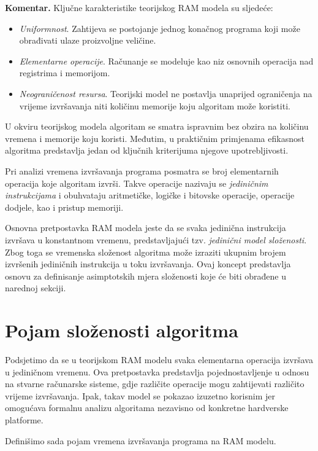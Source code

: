 \textbf{Komentar.} Ključne karakteristike teorijskog RAM modela su sljedeće:

\begin{itemize}
	\item \textit{Uniformnost}. Zahtijeva se postojanje jednog konačnog programa koji može obrađivati ulaze proizvoljne veličine.
	
	\item \textit{Elementarne operacije}. Računanje se modeluje kao niz osnovnih operacija nad registrima i memorijom.
	
	\item \textit{Neograničenost resursa}. Teorijski model ne postavlja unaprijed ograničenja na vrijeme izvršavanja niti količinu memorije koju algoritam može koristiti.
\end{itemize}

U okviru teorijskog modela algoritam se smatra ispravnim bez obzira na količinu vremena i memorije koju koristi. Međutim, u praktičnim primjenama efikasnost algoritma predstavlja jedan od ključnih kriterijuma njegove upotrebljivosti.

Pri analizi vremena izvršavanja programa posmatra se broj elementarnih operacija koje algoritam izvrši. Takve operacije nazivaju se \textit{jediničnim instrukcijama} i obuhvataju aritmetičke, logičke i bitovske operacije, operacije dodjele, kao i pristup memoriji.

Osnovna pretpostavka RAM modela jeste da se svaka jedinična instrukcija izvršava u konstantnom vremenu, predstavljajući tzv. \textit{jedinični model složenosti}.  Zbog toga se vremenska složenost algoritma može izraziti ukupnim brojem izvršenih jediničnih instrukcija u toku izvršavanja. Ovaj koncept predstavlja osnovu za definisanje asimptotskih mjera složenosti koje će biti obrađene u narednoj sekciji.

\section{Pojam složenosti algoritma}

Podsjetimo da se u teorijskom RAM modelu svaka elementarna operacija izvršava u jediničnom vremenu. Ova pretpostavka predstavlja pojednostavljenje u odnosu na stvarne računarske sisteme, gdje različite operacije mogu zahtijevati različito vrijeme izvršavanja. Ipak, takav model se pokazao izuzetno korisnim jer omogućava formalnu analizu algoritama nezavisno od konkretne hardverske platforme.

Definišimo sada pojam vremena izvršavanja programa na RAM modelu.

